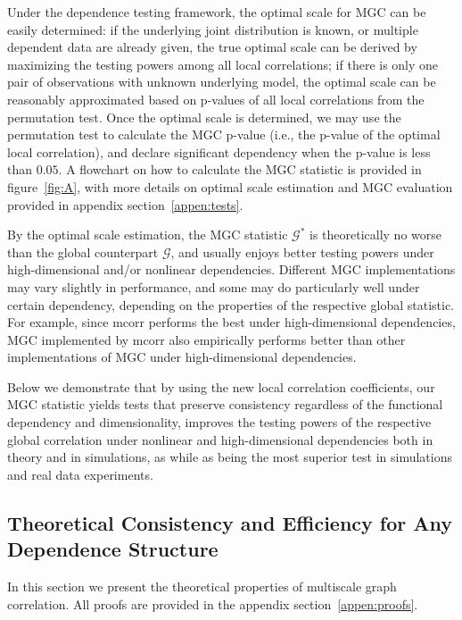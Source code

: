 \documentclass[11pt]{article}
\newcommand{\G}{\mathcal{G}}
\begin{document}
Under the dependence testing framework, the optimal scale for MGC can be easily determined: if the underlying joint distribution is known, or multiple dependent data are already given, the true optimal scale can be derived by maximizing the testing powers among all local correlations; if there is only one pair of observations with unknown underlying model, the optimal scale can be reasonably approximated based on p-values of all local correlations from the permutation test. Once the optimal scale is determined, we may use the permutation test to calculate the MGC p-value (i.e., the p-value of the optimal local correlation), and declare significant dependency when the p-value is less than $0.05$. A flowchart on how to calculate the MGC statistic is provided in figure~\ref{fig:A}, with more details on optimal scale estimation and MGC evaluation provided in appendix section~\ref{appen:tests}.

By the optimal scale estimation, the MGC statistic $\G^{*}$ is theoretically no worse than the global counterpart $\G$, and usually enjoys better testing powers under high-dimensional and/or nonlinear dependencies. Different MGC implementations may vary slightly in performance, and some may do particularly well under certain dependency, depending on the properties of the respective global statistic. For example, since mcorr performs the best under high-dimensional dependencies, MGC implemented by mcorr also empirically performs better than other implementations of MGC under high-dimensional dependencies. 

Below we demonstrate that by using the new local correlation coefficients, our MGC statistic yields tests that preserve consistency regardless of the functional dependency and dimensionality, improves the testing powers of the respective global correlation under nonlinear and high-dimensional dependencies both in theory and in simulations, as while as being the most superior test in simulations and real data experiments.


\subsection{Theoretical Consistency and Efficiency for Any Dependence Structure}
\label{main2}
In this section we present the theoretical properties of multiscale graph correlation. All proofs are provided in the appendix section~\ref{appen:proofs}. 
\end{document}
